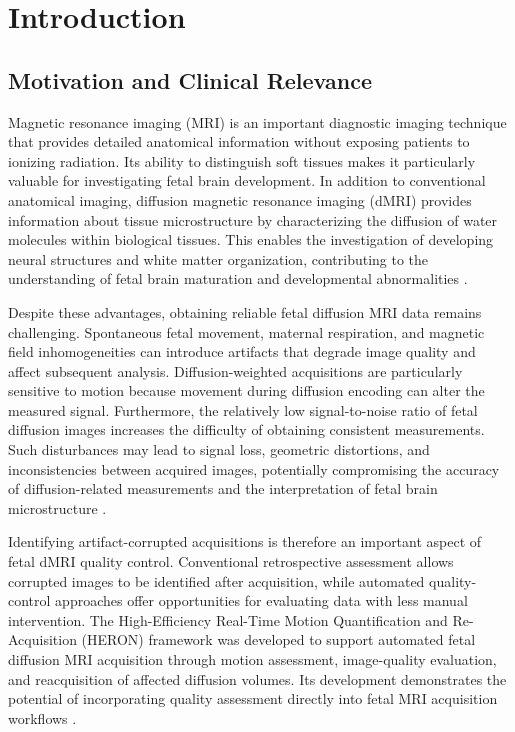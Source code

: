 \chapter{Introduction}
\section{Motivation and Clinical Relevance}

Magnetic resonance imaging (MRI) is an important diagnostic imaging technique that provides detailed anatomical information without exposing patients to ionizing radiation. Its ability to distinguish soft tissues makes it particularly valuable for investigating fetal brain development. In addition to conventional anatomical imaging, diffusion magnetic resonance imaging (dMRI) provides information about tissue microstructure by characterizing the diffusion of water molecules within biological tissues. This enables the investigation of developing neural structures and white matter organization, contributing to the understanding of fetal brain maturation and developmental abnormalities \autocite{malamateniou2013motion,snoussi2025haitch}.

Despite these advantages, obtaining reliable fetal diffusion MRI data remains challenging. Spontaneous fetal movement, maternal respiration, and magnetic field inhomogeneities can introduce artifacts that degrade image quality and affect subsequent analysis. Diffusion-weighted acquisitions are particularly sensitive to motion because movement during diffusion encoding can alter the measured signal. Furthermore, the relatively low signal-to-noise ratio of fetal diffusion images increases the difficulty of obtaining consistent measurements. Such disturbances may lead to signal loss, geometric distortions, and inconsistencies between acquired images, potentially compromising the accuracy of diffusion-related measurements and the interpretation of fetal brain microstructure \autocite{malamateniou2013motion,snoussi2025haitch}.

Identifying artifact-corrupted acquisitions is therefore an important aspect of fetal dMRI quality control. Conventional retrospective assessment allows corrupted images to be identified after acquisition, while automated quality-control approaches offer opportunities for evaluating data with less manual intervention. The High-Efficiency Real-Time Motion Quantification and Re-Acquisition (HERON) framework was developed to support automated fetal diffusion MRI acquisition through motion assessment, image-quality evaluation, and reacquisition of affected diffusion volumes. Its development demonstrates the potential of incorporating quality assessment directly into fetal MRI acquisition workflows \autocite{avilesverdera2025heron}.

